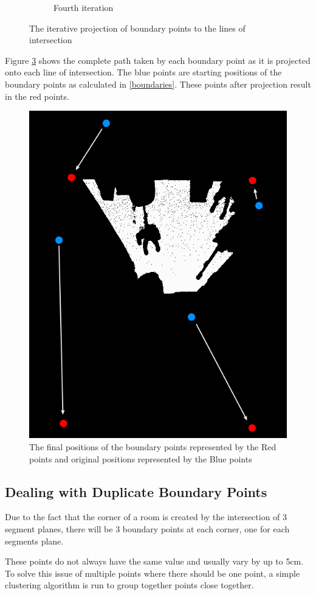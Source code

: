 \begin{figure}[H]
\begin{subfigure}[b]{0.5\linewidth}
					\caption{Fourth iteration} 
					\label{fig4Adjust:d} 
				\end{subfigure} 
				\caption{The iterative projection of boundary points to the lines of intersection}
				\label{fig:4Adjust} 
			\end{figure}
			
			Figure \ref{fig:F-5} shows the complete path taken by each boundary point as it is projected onto each line of intersection. The blue points are starting positions of the boundary points as calculated in \ref{boundaries}. These points after projection result in the red points.

			\begin{figure}[H]
				\centering
				\includegraphics[width=0.6\linewidth]{"Includes/images/Project Points/F-5"}
				\caption{The final positions of the boundary points represented by the Red points and original positions represented by the Blue points}
				\label{fig:F-5}
			\end{figure}
			
		\subsection{Dealing with Duplicate Boundary Points}
			Due to the fact that the corner of a room is created by the intersection of 3 segment planes, there will be 3 boundary points at each corner, one for each segments plane.
			
			These points do not always have the same value and usually vary by up to 5cm. To solve this issue of multiple points where there should be one point, a simple clustering algorithm is run to group together points close together.
			
